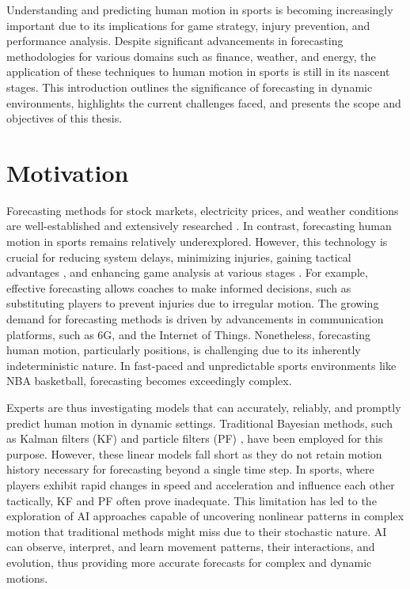 Understanding and predicting human motion in sports is becoming increasingly important due to its implications for game strategy, injury prevention, and performance analysis. Despite significant advancements in forecasting methodologies for various domains such as finance, weather, and energy, the application of these techniques to human motion in sports is still in its nascent stages. This introduction outlines the significance of forecasting in dynamic environments, highlights the current challenges faced, and presents the scope and objectives of this thesis.
\section{Motivation}
Forecasting methods for stock markets, electricity prices, and weather conditions are well-established and extensively researched \cite{rapach2020, ribeiro2021, mills2019}. In contrast, forecasting human motion in sports remains relatively underexplored. However, this technology is crucial for reducing system delays, minimizing injuries, gaining tactical advantages \cite{advantages1}, and enhancing game analysis at various stages \cite{postgame}. For example, effective forecasting allows coaches to make informed decisions, such as substituting players to prevent injuries due to irregular motion. The growing demand for forecasting methods is driven by advancements in communication platforms, such as 6G, and the Internet of Things. Nonetheless, forecasting human motion, particularly positions, is challenging due to its inherently indeterministic nature. In fast-paced and unpredictable sports environments like NBA basketball, forecasting becomes exceedingly complex.

Experts are thus investigating models that can accurately, reliably, and promptly predict human motion in dynamic settings. Traditional Bayesian methods, such as Kalman filters (KF) and particle filters (PF) \cite{diss_tobi}, have been employed for this purpose. However, these linear models fall short as they do not retain motion history necessary for forecasting beyond a single time step. In sports, where players exhibit rapid changes in speed and acceleration and influence each other tactically, KF and PF often prove inadequate. This limitation has led to the exploration of AI approaches capable of uncovering nonlinear patterns in complex motion that traditional methods might miss due to their stochastic nature. AI can observe, interpret, and learn movement patterns, their interactions, and evolution, thus providing more accurate forecasts for complex and dynamic motions.

